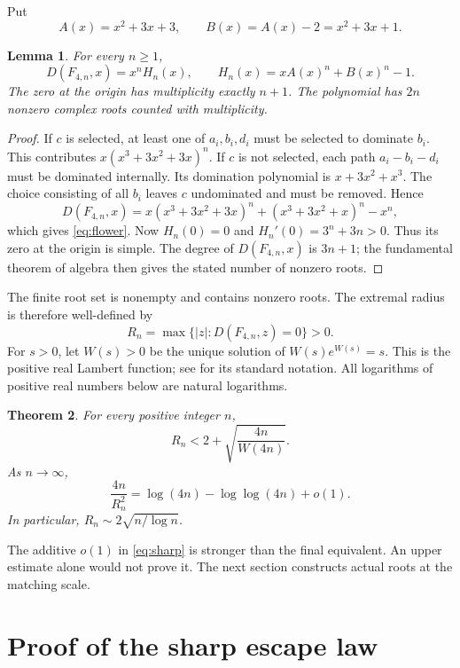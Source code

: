 \documentclass[11pt,a4paper]{article}
\newtheorem{theorem}{Theorem}
\newtheorem{lemma}[theorem]{Lemma}
\begin{document}
Put
\[
 A(x)=x^2+3x+3,\qquad B(x)=A(x)-2=x^2+3x+1.
\]
\begin{lemma}\label{lem:count}
For every $n\ge1$,
\begin{equation}\label{eq:flower}
 D(F_{4,n},x)=x^nH_n(x),\qquad H_n(x)=xA(x)^n+B(x)^n-1.
\end{equation}
The zero at the origin has multiplicity exactly $n+1$. The polynomial has
$2n$ nonzero complex roots counted with multiplicity.
\end{lemma}
\begin{proof}
If $c$ is selected, at least one of $a_i,b_i,d_i$ must be selected to dominate
$b_i$. This contributes $x(x^3+3x^2+3x)^n$.
If $c$ is not selected, each path $a_i-b_i-d_i$ must be dominated internally.
Its domination polynomial is $x+3x^2+x^3$. The choice consisting of all $b_i$
leaves $c$ undominated and must be removed. Hence
\[
 D(F_{4,n},x)=x(x^3+3x^2+3x)^n+(x^3+3x^2+x)^n-x^n,
\]
which gives \eqref{eq:flower}. Now $H_n(0)=0$ and
$H_n'(0)=3^n+3n>0$. Thus its zero at the origin is simple.
The degree of $D(F_{4,n},x)$ is $3n+1$; the fundamental theorem of algebra
then gives the stated number of nonzero roots.
\end{proof}

The finite root set is nonempty and contains nonzero roots. The extremal radius is therefore well-defined by
\[
 R_n=\max\{|z|:D(F_{4,n},z)=0\}>0.
\]
For $s>0$, let $W(s)>0$ be the unique solution of $W(s)e^{W(s)}=s$.
This is the positive real Lambert function; see \cite{corless1996} for its standard notation.
All logarithms of positive real numbers below are natural logarithms.

\begin{theorem}\label{thm:escape}
For every positive integer $n$,
\begin{equation}\label{eq:upper}
 R_n<2+\sqrt{\frac{4n}{W(4n)}}.
\end{equation}
As $n\to\infty$,
\begin{equation}\label{eq:sharp}
 \frac{4n}{R_n^2}=\log(4n)-\log\log(4n)+o(1).
\end{equation}
In particular, $R_n\sim2\sqrt{n/\log n}$.
\end{theorem}
The additive $o(1)$ in \eqref{eq:sharp} is stronger than the final equivalent.
An upper estimate alone would not prove it. The next section constructs
actual roots at the matching scale.

\section{Proof of the sharp escape law}
\end{document}
